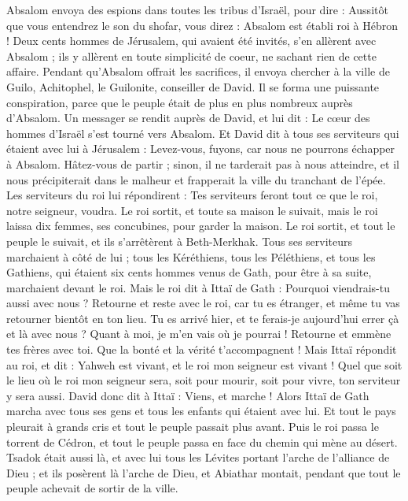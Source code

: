 \begin{multicols}{2}
Absalom envoya des espions dans toutes les tribus d'Israël, pour dire : Aussitôt que vous entendrez le son du shofar, vous direz : Absalom est établi roi à Hébron !
Deux cents hommes de Jérusalem, qui avaient été invités, s'en allèrent avec Absalom ; ils y allèrent en toute simplicité de coeur, ne sachant rien de cette affaire.
Pendant qu’Absalom offrait les sacrifices, il envoya chercher à la ville de Guilo, Achitophel, le Guilonite, conseiller de David. Il se forma une puissante conspiration, parce que le peuple était de plus en plus nombreux auprès d’Absalom.
Un messager se rendit auprès de David, et lui dit : Le cœur des hommes d’Israël s’est tourné vers Absalom.
Et David dit à tous ses serviteurs qui étaient avec lui à Jérusalem : Levez-vous, fuyons, car nous ne pourrons échapper à Absalom. Hâtez-vous de partir ; sinon, il ne tarderait pas à nous atteindre, et il nous précipiterait dans le malheur et frapperait la ville du tranchant de l’épée.
Les serviteurs du roi lui répondirent : Tes serviteurs feront tout ce que le roi, notre seigneur, voudra.
Le roi sortit, et toute sa maison le suivait, mais le roi laissa dix femmes, ses concubines, pour garder la maison.
Le roi sortit, et tout le peuple le suivait, et ils s'arrêtèrent à Beth-Merkhak.
Tous ses serviteurs marchaient à côté de lui ; tous les Kéréthiens, tous les Péléthiens, et tous les Gathiens, qui étaient six cents hommes venus de Gath, pour être à sa suite, marchaient devant le roi.
Mais le roi dit à Ittaï de Gath : Pourquoi viendrais-tu aussi avec nous ? Retourne et reste avec le roi, car tu es étranger, et même tu vas retourner bientôt en ton lieu.
Tu es arrivé hier, et te ferais-je aujourd'hui errer çà et là avec nous ? Quant à moi, je m’en vais où je pourrai ! Retourne et emmène tes frères avec toi. Que la bonté et la vérité t’accompagnent !
Mais Ittaï répondit au roi, et dit : Yahweh est vivant, et le roi mon seigneur est vivant ! Quel que soit le lieu où le roi mon seigneur sera, soit pour mourir, soit pour vivre, ton serviteur y sera aussi.
David donc dit à Ittaï : Viens, et marche ! Alors Ittaï de Gath marcha avec tous ses gens et tous les enfants qui étaient avec lui.
Et tout le pays pleurait à grands cris et tout le peuple passait plus avant. Puis le roi passa le torrent de Cédron, et tout le peuple passa en face du chemin qui mène au désert.
Tsadok était aussi là, et avec lui tous les Lévites portant l'arche de l'alliance de Dieu ; et ils posèrent là l'arche de Dieu, et Abiathar montait, pendant que tout le peuple achevait de sortir de la ville.

\end{multicols}
